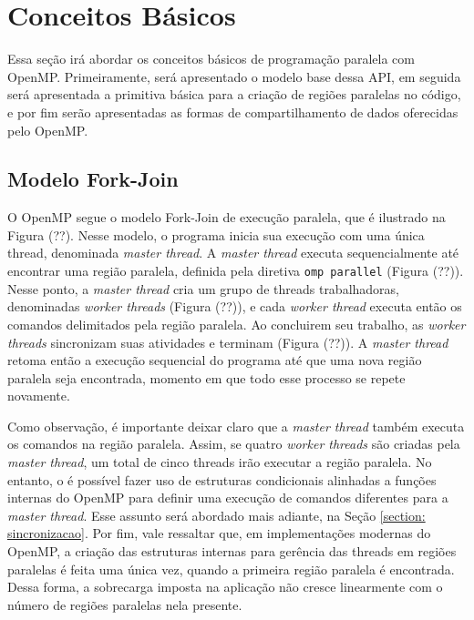 \documentclass{SBCbookchapter}
\begin{document}
\section{Conceitos Básicos}

	Essa seção irá abordar os conceitos básicos de programação paralela com
	OpenMP. Primeiramente, será apresentado o modelo base dessa API, em
	seguida será apresentada a primitiva básica para a criação de regiões
	paralelas no código, e por fim serão apresentadas as formas de
	compartilhamento de dados oferecidas pelo OpenMP.

	\subsection{Modelo Fork-Join}

		O OpenMP segue o modelo Fork-Join de execução paralela, que é
		ilustrado na Figura (??). Nesse modelo, o programa inicia sua
		execução com uma única thread, denominada \textit{master thread}. A
		\textit{master thread} executa sequencialmente até encontrar uma
		região paralela, definida pela diretiva \texttt{omp parallel}
		(Figura (??)). Nesse ponto, a \textit{master thread} cria um grupo
		de threads trabalhadoras, denominadas \textit{worker threads}
		(Figura (??)), e cada \textit{worker thread} executa então os
		comandos delimitados pela região paralela. Ao concluirem seu
		trabalho, as \textit{worker threads} sincronizam suas atividades e
		terminam (Figura (??)). A \textit{master thread} retoma então a
		execução sequencial do programa até que uma nova região paralela
		seja encontrada, momento em que todo esse processo se repete
		novamente.
		
		Como observação, é importante deixar claro que a \textit{master
		thread} também executa os comandos na região paralela. Assim, se
		quatro \textit{worker threads} são criadas pela \textit{master
		thread}, um total de cinco threads irão executar a região paralela.
		No entanto, o é possível fazer uso de estruturas condicionais
		alinhadas a funções internas do OpenMP para definir uma execução de
		comandos diferentes para a \textit{master thread}. Esse assunto será
		abordado mais adiante, na Seção \ref{section: sincronizacao}. Por
		fim, vale ressaltar que, em implementações modernas do OpenMP, a
		criação das estruturas internas para gerência das threads em regiões
		paralelas é feita uma única vez, quando a primeira região paralela é
		encontrada. Dessa forma, a sobrecarga imposta na aplicação não
		cresce linearmente com o número de regiões paralelas nela presente.
\end{document}
